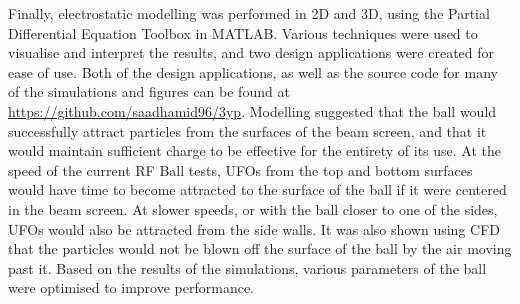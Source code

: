 \documentclass[../main.tex]{subfiles}
\begin{document}
Finally, electrostatic modelling was performed in 2D and 3D, using the Partial Differential Equation Toolbox in MATLAB.
Various techniques were used to visualise and interpret the results, and two design applications were created for ease of use.
Both of the design applications, as well as the source code for many of the simulations and figures can be found at \url{https://github.com/saadhamid96/3yp}.
Modelling suggested that the ball would successfully attract particles from the surfaces of the beam screen, and that it would maintain sufficient charge to be effective for the entirety of its use.
At the speed of the current RF Ball tests, UFOs from the top and bottom surfaces would have time to become attracted to the surface of the ball if it were centered in the beam screen.
At slower speeds, or with the ball closer to one of the sides, UFOs would also be attracted from the side walls.
It was also shown using CFD that the particles would not be blown off the surface of the ball by the air moving past it.
Based on the results of the simulations, various parameters of the ball were optimised to improve performance.

\end{document}
